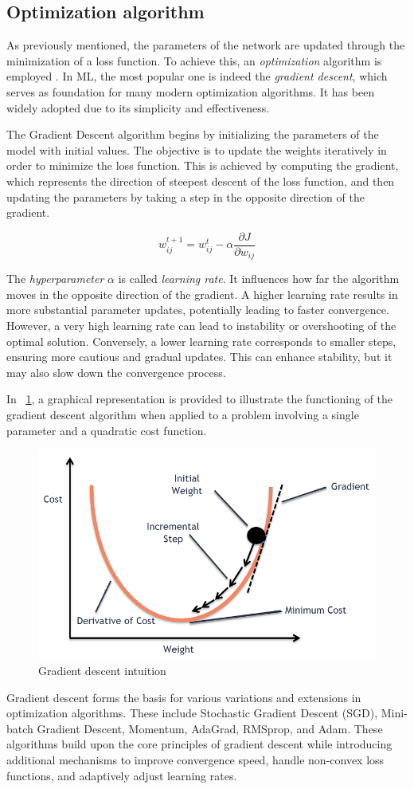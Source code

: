 \subsection{Optimization algorithm}

As previously mentioned, the parameters of the network are updated through the minimization of a loss function. To achieve this, an \textit{optimization} algorithm is employed \cite{Goodfellow-et-al-2016}. In ML, the most popular one is indeed the \textit{gradient descent}, which serves as foundation for many modern optimization algorithms. It has been widely adopted due to its simplicity and effectiveness.

The Gradient Descent algorithm begins by initializing the parameters of the model with initial values. The objective is to update the weights iteratively in order to minimize the loss function. This is achieved by computing the gradient, which represents the direction of steepest descent of the loss function, and then updating the parameters by taking a step in the opposite direction of the gradient.

\[
	w_{ij}^{t+1} = w_{ij}^t - \alpha\frac{\partial J}{\partial w_{ij}}
\]

The \textit{hyperparameter} $\alpha$ is called \textit{learning rate}. It influences how far the algorithm moves in the opposite direction of the gradient. A higher learning rate results in more substantial parameter updates, potentially leading to faster convergence. However, a very high learning rate can lead to instability or overshooting of the optimal solution. Conversely, a lower learning rate corresponds to smaller steps, ensuring more cautious and gradual updates. This can enhance stability, but it may also slow down the convergence process.

In \Fig~\ref{fig:graddesc}, a graphical representation is provided to illustrate the functioning of the gradient descent algorithm when applied to a problem involving a single parameter and a quadratic cost function.

\begin{figure}[h]
	\centering
	\includegraphics[width=0.6\linewidth]{ImageFiles/NeuralNetworks/graddesc}
	\caption{Gradient descent intuition \cite{GDAWML}}
	\label{fig:graddesc}
\end{figure}

Gradient descent forms the basis for various variations and extensions in optimization algorithms. These include Stochastic Gradient Descent (SGD), Mini-batch Gradient Descent, Momentum, AdaGrad, RMSprop, and Adam. These algorithms build upon the core principles of gradient descent while introducing additional mechanisms to improve convergence speed, handle non-convex loss functions, and adaptively adjust learning rates.